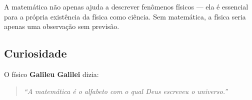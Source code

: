 \documentclass[portuguese,11pt,a4paper,oneside, openany]{article}
\begin{document}
	A matemática não apenas ajuda a descrever fenômenos físicos — ela é essencial para a própria existência da física como ciência. Sem matemática, a física seria apenas uma observação sem previsão.
	
	\subsection*{Curiosidade}
	
	O físico \textbf{Galileu Galilei} dizia:
	
	\begin{quote}
		\textit{“A matemática é o alfabeto com o qual Deus escreveu o universo.”}
	\end{quote}
	
	
\end{document}
